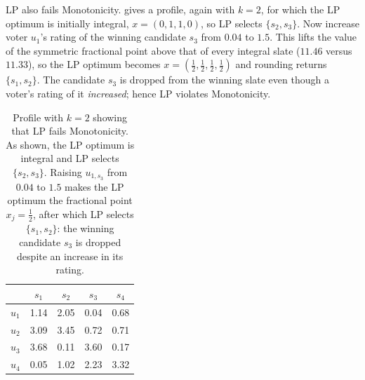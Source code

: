 \documentclass[11pt]{article}
\newcommand{\LP}{\textsc{LP}}
\begin{document}
\LP{} also fails Monotonicity.  gives a profile,
again with $k=2$, for which the LP optimum is initially integral,
$x=(0,1,1,0)$, so \LP{} selects $\{s_2,s_3\}$. Now increase voter $u_1$'s
rating of the winning candidate $s_3$ from $0.04$ to $1.5$. This lifts the
value of the symmetric fractional point above that of every integral slate
($11.46$ versus $11.33$), so the LP optimum becomes
$x=(\tfrac12,\tfrac12,\tfrac12,\tfrac12)$ and rounding returns
$\{s_1,s_2\}$. The candidate $s_3$ is dropped from the winning slate even
though a voter's rating of it \emph{increased}; hence \LP{} violates
Monotonicity.

\begin{table}[t]
\centering
\begin{tabular}{lcccc}
\hline
 & $s_1$ & $s_2$ & $s_3$ & $s_4$ \\
\hline
$u_1$ & 1.14 & 2.05 & 0.04 & 0.68 \\
$u_2$ & 3.09 & 3.45 & 0.72 & 0.71 \\
$u_3$ & 3.68 & 0.11 & 3.60 & 0.17 \\
$u_4$ & 0.05 & 1.02 & 2.23 & 3.32 \\
\hline
\end{tabular}
\caption{Profile with $k=2$ showing that \LP{} fails Monotonicity. As shown,
the LP optimum is integral and \LP{} selects $\{s_2,s_3\}$. Raising
$u_{1,s_3}$ from $0.04$ to $1.5$ makes the LP optimum the fractional point
$x_j=\tfrac12$, after which \LP{} selects $\{s_1,s_2\}$: the winning candidate
$s_3$ is dropped despite an increase in its rating.}
\label{tab:lp-monotonicity}
\end{table}



\end{document}
